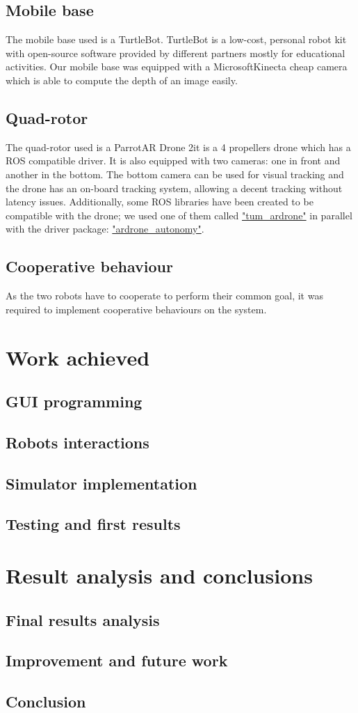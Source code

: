 \documentclass[11pt,a4paper]{article}
\begin{document}
\subsection{Mobile base}
The mobile base used is a TurtleBot. TurtleBot is a low-cost, personal robot kit with open-source software provided by different partners mostly for educational activities.
Our mobile base was equipped with a Microsoft\textcopyright Kinect\texttrademark a cheap camera which is able to compute the depth of an image easily.

\subsection{Quad-rotor}
The quad-rotor used is a Parrot\textcopyright AR Drone 2\texttrademark it is a 4 propellers
drone which has a ROS compatible driver. It is also equipped with two cameras: one in front
and another in the bottom. The bottom camera can be used for visual tracking and the drone
has an on-board tracking system, allowing a decent tracking without latency issues.
Additionally, some ROS libraries have been created to be compatible with the drone; we used
one of them called \href{"http://wiki.ros.org/tum_ardrone"}{"tum\_ardrone"} in parallel with
the driver package: \href{"https://github.com/AutonomyLab/ardrone_autonomy"}
{"ardrone\_autonomy"}.

\subsection{Cooperative behaviour}
As the two robots have to cooperate to perform their common goal, it was required to implement
cooperative behaviours on the system.

\section{Work achieved}
\subsection{GUI programming}
\subsection{Robots interactions}
\subsection{Simulator implementation}
\subsection{Testing and first results}

\section{Result analysis and conclusions}
\subsection{Final results analysis}
\subsection{Improvement and future work}
\subsection{Conclusion}




\end{document}
